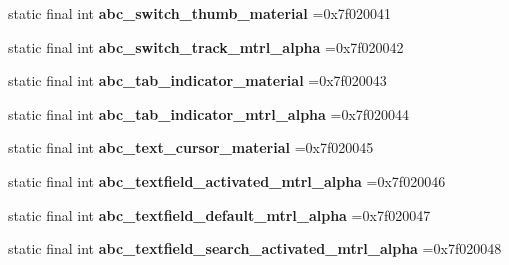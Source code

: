 \begin{DoxyCompactItemize}
\item 
\mbox{\label{classproject4_1_1xaria_1_1R_1_1drawable_aab811906b5a172a1c7e8521d4d2cd2f2}} 
static final int {\bfseries abc\+\_\+switch\+\_\+thumb\+\_\+material} =0x7f020041
\item 
\mbox{\label{classproject4_1_1xaria_1_1R_1_1drawable_acf7adfd6c3112a3376b9d1e9a6cf8ad6}} 
static final int {\bfseries abc\+\_\+switch\+\_\+track\+\_\+mtrl\+\_\+alpha} =0x7f020042
\item 
\mbox{\label{classproject4_1_1xaria_1_1R_1_1drawable_a82e318d6152e392b5561dc6ba70a50bc}} 
static final int {\bfseries abc\+\_\+tab\+\_\+indicator\+\_\+material} =0x7f020043
\item 
\mbox{\label{classproject4_1_1xaria_1_1R_1_1drawable_a638eee04c141dd79d58dd173f34f40d3}} 
static final int {\bfseries abc\+\_\+tab\+\_\+indicator\+\_\+mtrl\+\_\+alpha} =0x7f020044
\item 
\mbox{\label{classproject4_1_1xaria_1_1R_1_1drawable_ac738c6bac2b37c746a94f2f531f5b9d2}} 
static final int {\bfseries abc\+\_\+text\+\_\+cursor\+\_\+material} =0x7f020045
\item 
\mbox{\label{classproject4_1_1xaria_1_1R_1_1drawable_a0728c57d82f6c01a0f0b18674c395782}} 
static final int {\bfseries abc\+\_\+textfield\+\_\+activated\+\_\+mtrl\+\_\+alpha} =0x7f020046
\item 
\mbox{\label{classproject4_1_1xaria_1_1R_1_1drawable_a22cdeed637c0d627a6201b2a31f25c22}} 
static final int {\bfseries abc\+\_\+textfield\+\_\+default\+\_\+mtrl\+\_\+alpha} =0x7f020047
\item 
\mbox{\label{classproject4_1_1xaria_1_1R_1_1drawable_a7d7e6d93a6acc9f0d42aafea160f14e5}} 
static final int {\bfseries abc\+\_\+textfield\+\_\+search\+\_\+activated\+\_\+mtrl\+\_\+alpha} =0x7f020048
\item 
\mbox{\label{classproject4_1_1xaria_1_1R_1_1drawable_a5760b7ff414772cc8d2bd5ff52e2b128}} 

\end{DoxyCompactItemize}

